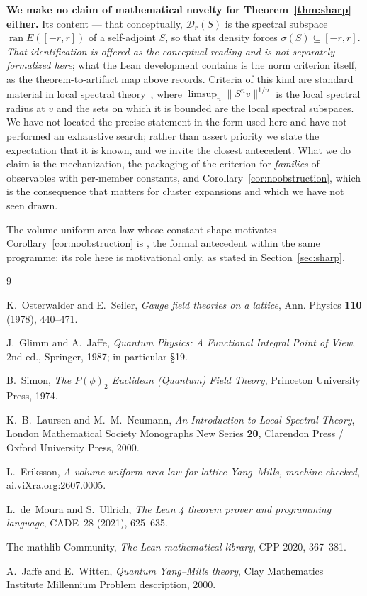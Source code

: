\documentclass[11pt]{article}
\theoremstyle{definition}
\begin{document}
\textbf{We make no claim of mathematical novelty for
Theorem~\ref{thm:sharp} either.}  Its content --- that
conceptually, $\mathcal{D}_r(S)$ is the spectral subspace
$\operatorname{ran} E([-r,r])$ of a self-adjoint $S$, so that its density
forces $\sigma(S) \subseteq [-r,r]$.  \emph{That identification is offered
as the conceptual reading and is not separately formalized here}; what the
Lean development contains is the norm criterion itself, as the
theorem-to-artifact map above records.  Criteria of this kind are standard
material in local spectral theory~\cite{LaursenNeumann}, where
$\limsup_n \|S^n v\|^{1/n}$ is the local spectral radius at $v$ and the
sets on which it is bounded are the local spectral subspaces.  We have not
located the precise statement in the form used here and have not performed
an exhaustive search; rather than assert priority we state the expectation
that it is known, and we invite the closest antecedent.  What we do claim
is the mechanization, the packaging of the criterion for \emph{families}
of observables with per-member constants, and
Corollary~\ref{cor:noobstruction}, which is the consequence that matters
for cluster expansions and which we have not seen drawn.

The volume-uniform area law whose constant shape motivates
Corollary~\ref{cor:noobstruction} is \cite{ErikssonAreaLaw}, the formal
antecedent within the same programme; its role here is motivational only,
as stated in Section~\ref{sec:sharp}.

\begin{thebibliography}{9}

K.~Osterwalder and E.~Seiler,
\emph{Gauge field theories on a lattice},
Ann. Physics \textbf{110} (1978), 440--471.

J.~Glimm and A.~Jaffe,
\emph{Quantum Physics: A Functional Integral Point of View},
2nd ed., Springer, 1987; in particular \S19.

B.~Simon,
\emph{The $P(\phi)_2$ Euclidean (Quantum) Field Theory},
Princeton University Press, 1974.

K.~B.~Laursen and M.~M.~Neumann,
\emph{An Introduction to Local Spectral Theory},
London Mathematical Society Monographs New Series \textbf{20},
Clarendon Press / Oxford University Press, 2000.

L.~Eriksson,
\emph{A volume-uniform area law for lattice Yang--Mills, machine-checked},
ai.viXra.org:2607.0005.

L.~de~Moura and S.~Ullrich,
\emph{The Lean 4 theorem prover and programming language},
CADE~28 (2021), 625--635.

The mathlib Community,
\emph{The Lean mathematical library},
CPP 2020, 367--381.

A.~Jaffe and E.~Witten,
\emph{Quantum Yang--Mills theory},
Clay Mathematics Institute Millennium Problem description, 2000.

\end{thebibliography}
\end{document}

